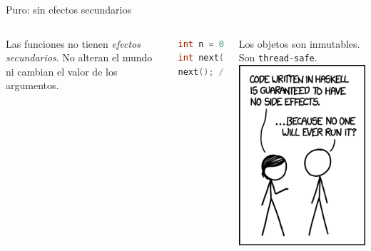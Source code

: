 \begin{frame}[fragile]{Puro: sin efectos secundarios}

  \begin{columns}
    Las funciones no tienen \textit{efectos secundarios}.
    No alteran el mundo ni cambian el valor de los argumentos.
    \espacio
  \begin{lstlisting}[language=C++]
int n = 0;
int next() { return n++; }
next(); // n = 1
  \end{lstlisting}
  \espacio
  Los objetos son inmutables. Son \texttt{thread-safe}.
    \includegraphics[width=\textwidth]{./images/xkcd-haskell.png}
  \end{columns}

\end{frame}

